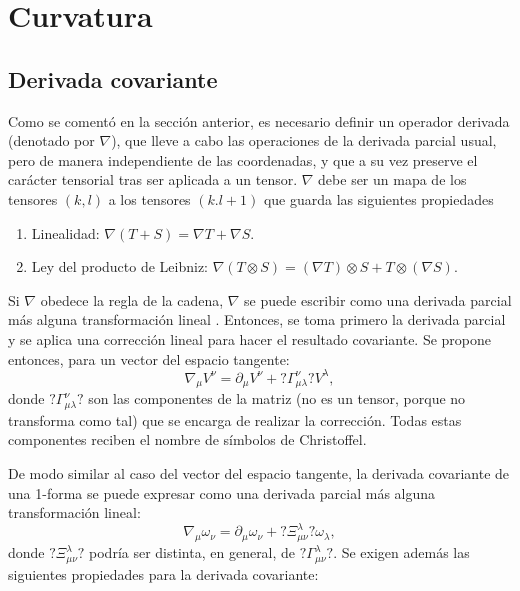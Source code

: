 \section{Curvatura}
\subsection{Derivada covariante}
Como se comentó en la sección anterior, es necesario definir un operador derivada (denotado por $\nabla$), que lleve a cabo las operaciones de la derivada parcial usual, pero de manera independiente de las coordenadas, y que a su vez preserve el carácter tensorial tras ser aplicada a un tensor. $\nabla$ debe ser un mapa de los tensores $(k,l)$ a los tensores $(k.l+1)$ que guarda las siguientes propiedades
\begin{enumerate}
	\item Linealidad: $\nabla(T+S)=\nabla T+\nabla S$.
	\item Ley del producto de Leibniz: $\nabla(T\otimes S)=(\nabla T)\otimes S+T\otimes(\nabla S).$
\end{enumerate}
Si $\nabla$ obedece la regla de la cadena, $\nabla$ se puede escribir como una derivada parcial más alguna transformación lineal \cite{Thorne}. Entonces, se toma primero la derivada parcial y se aplica una corrección lineal para hacer el resultado covariante. Se propone entonces, para un vector del espacio tangente:
\begin{equation}
\nabla_\mu V^\nu= \partial_\mu V^\nu+?\Gamma^\nu_{\mu\lambda}? V^\lambda,
\end{equation}
donde $?\Gamma^\nu_{\mu\lambda}?$ son las componentes de la matriz (no es un tensor, porque no transforma como tal) que se encarga de realizar la corrección. Todas estas componentes reciben el nombre de símbolos de Christoffel.

De modo similar al caso del vector del espacio tangente, la derivada covariante de una 1-forma se puede expresar como una derivada parcial más alguna transformación lineal:
$$\nabla_\mu \omega_\nu=\partial_\mu \omega_\nu+ ?\Xi^\lambda_{\mu\nu}?\omega_\lambda,$$
donde $?\Xi^\lambda_{\mu\nu}?$ podría ser distinta, en general, de $?\Gamma^\lambda_{\mu\nu}?$. Se exigen además las siguientes propiedades para la derivada covariante:


